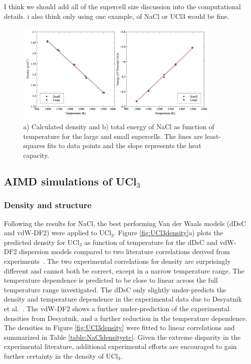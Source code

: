 \documentclass[preprint,3p,10pt,onecolumn,number,sort&compress]{elsarticle}
\begin{document}
{\color{red} I think we should add all of the supercell size discussion into the computational details. i also think only using one example, of NaCl or UCl3 would be fine.} 

\begin{figure}[htb]
\centering
\includegraphics[width=0.9\textwidth]{fig4.jpg}
\caption{a) Calculated density and b) total energy of NaCl as function of temperature for the large and small supercells. The lines are least-squares fits to data points and the slope represents the heat capacity.} 
\label{fig:NaClsize}
\end{figure}


\FloatBarrier

\subsection{AIMD simulations of UCl$_3$}
\subsubsection{Density and structure}
Following the results for NaCl, the best performing Van der Waals models (dDsC and vdW-DF2) were applied to UCl$_3$. Figure \ref{fig:UCl3density}a) plots the predicted density for UCl$_3$ as function of temperature for the dDsC and vdW-DF2 dispersion models compared to two literature correlations derived from experiments~\cite{Janz1988,Desyatnik}. The two experimental correlations for density are surprisingly different and cannot both be correct, except in a narrow temperature range.  The temperature dependence is predicted to be close to linear across the full temperature range investigated. The dDsC only slightly under-predicts the density and temperature dependence in the experimental data due to Desyatnik et al.~\cite{Desyatnik}. The vdW-DF2 shows a further under-prediction of the experimental densities from Desyatnik, and a further reduction in the temperature dependence. The densities in Figure \ref{fig:UCl3density} were fitted to linear correlations and summarized in Table \ref{table:NaCldensityetc}. Given the extreme disparity in the experimental literature, additional experimental efforts are encouraged to gain further certainty in the density of UCl$_3$. 
\end{document}
